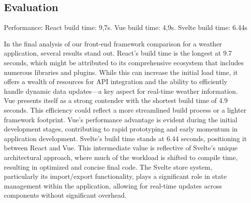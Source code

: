 \subsection*{Evaluation}

Performance:
React build time: 9,7s.
Vue build time: 4,9s.
Svelte build time: 6.44s

In the final analysis of our front-end framework comparison for a weather application, several results stand out. React's build time is the longest at 9.7 seconds, which might be attributed to its comprehensive ecosystem that includes numerous libraries and plugins. While this can increase the initial load time, it offers a wealth of resources for API integration and the ability to efficiently handle dynamic data updates—a key aspect for real-time weather information.
Vue presents itself as a strong contender with the shortest build time of 4.9 seconds. This efficiency could reflect a more streamlined build process or a lighter framework footprint. Vue's performance advantage is evident during the initial development stages, contributing to rapid prototyping and early momentum in application development.
Svelte's build time stands at 6.44 seconds, positioning it between React and Vue. This intermediate value is reflective of Svelte's unique architectural approach, where much of the workload is shifted to compile time, resulting in optimized and concise final code. The Svelte store system, particularly its import/export functionality, plays a significant role in state management within the application, allowing for real-time updates across components without significant overhead.


